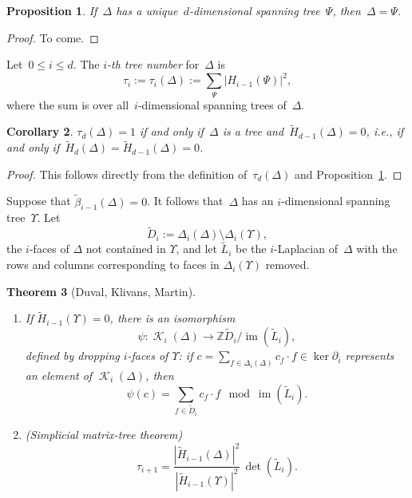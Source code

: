 \documentclass[12pt]{article}
\newcommand{\Z}{\mathbb{Z}}
\newcommand{\tL}{\widetilde{L}}
\newcommand{\tH}{\widetilde{H}}
\newcommand{\tD}{\widetilde{D}}
\newcommand{\tb}{\tilde{\beta}}
\DeclareMathOperator{\im}{\mathrm{im}}
\DeclareMathOperator{\crit}{\mathcal{K}}
\newtheorem{theorem}{Theorem}[section]
\newtheorem{cor}[theorem]{Corollary}
\newtheorem{prop}[theorem]{Proposition}
\theoremstyle{definition}
\theoremstyle{remark}
\begin{document}
\begin{prop}\label{prop: unique tree} If~$\Delta$ has a unique~$d$-dimensional spanning tree~$\Psi$,
  then~$\Delta=\Psi$.
\end{prop}
\begin{proof}
  To come.
\end{proof}

Let~$0\leq i\leq d$.  The {\em $i$-th tree number} for~$\Delta$ is
\[
  \tau_i:=\tau_i(\Delta):=\sum_{\Psi}|H_{i-1}(\Psi)|^2,
\]
where the sum is over all~$i$-dimensional spanning trees of~$\Delta$.

\begin{cor}\label{cor: tree number}
  $\tau_d(\Delta)=1$ if and only if~$\Delta$ is a tree
  and~$\tH_{d-1}(\Delta)=0$, i.e., if and only
  if~$\tH_d(\Delta)=\tH_{d-1}(\Delta)=0$.
\end{cor}
\begin{proof}
  This follows directly from the definition of~$\tau_d(\Delta)$ and
  Proposition~\ref{prop: unique tree}.
\end{proof}

Suppose that $\tb_{i-1}(\Delta)=0$.  It follows that~$\Delta$ has an
$i$-dimensional spanning tree~$\Upsilon$. Let
\[
  \tD_i:=\Delta_i(\Delta)\setminus \Delta_i(\Upsilon),
\]
the $i$-faces of $\Delta$ not contained in $\Upsilon$, and let $\tL_i$ be the
$i$-Laplacian of~$\Delta$ with the rows and columns corresponding to faces in
$\Delta_i(\Upsilon)$ removed.

\begin{theorem}[Duval, Klivans, Martin]\label{thm: simplicial matrix-tree}
  \leavevmode
\begin{enumerate}[label={\rm (\roman*)}]
  \item\label{thm: smt1}  If $\tH_{i-1}(\Upsilon)=0$, there is an isomorphism
    \[
      \psi\colon\crit_i(\Delta)\to \Z\tD_i/\im(\tL_i),
    \]
    defined by dropping $i$-faces
    of $\Upsilon$:   if
    $c=\sum_{f\in \Delta_i(\Delta)}c_f\cdot f\in\ker\partial_i$ represents an element
    of $\crit_i(\Delta)$, then 
    \[
      \psi(c)=\sum_{f\in\tD_i}c_f\cdot f\ \bmod\im(\tL_i).
  \]
\item\label{thm: smt2} (Simplicial matrix-tree theorem)
  \[
    \tau_{i+1}=\frac{|\tH_{i-1}(\Delta)|^2}{|\tH_{i-1}(\Upsilon)|^2}\,\det(\tL_i).
  \]
\end{enumerate}
\end{theorem}
\end{document}
